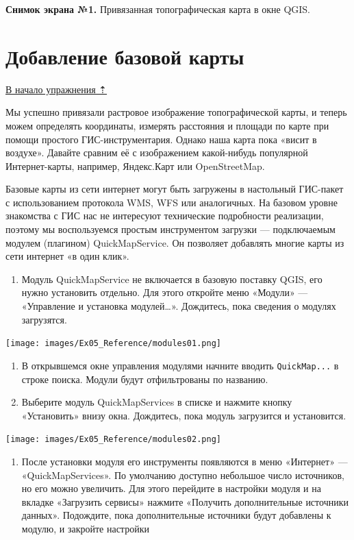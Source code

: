 \documentclass[
  12pt,
]{book}
\providecommand{\tightlist}{%
  \setlength{\itemsep}{0pt}\setlength{\parskip}{0pt}}
\begin{document}
\textbf{Снимок экрана №1.} Привязанная топографическая карта в окне QGIS.

\hypertarget{raster-reference-basemap}{%
\section{Добавление базовой карты}\label{raster-reference-basemap}}

\protect\hyperlink{raster-reference}{В начало упражнения ⇡}

Мы успешно привязали растровое изображение топографической карты, и теперь можем определять координаты, измерять расстояния и площади по карте при помощи простого ГИС-инструментария. Однако наша карта пока «висит в воздухе». Давайте сравним её с изображением какой-нибудь популярной Интернет-карты, например, Яндекс.Карт или OpenStreetMap.

Базовые карты из сети интернет могут быть загружены в настольный ГИС-пакет с использованием протокола WMS, WFS или аналогичных. На базовом уровне знакомства с ГИС нас не интересуют технические подробности реализации, поэтому мы воспользуемся простым инструментом загрузки --- подключаемым модулем (плагином) QuickMapService. Он позволяет добавлять многие карты из сети интернет «в один клик».

\begin{enumerate}
\def\labelenumi{\arabic{enumi}.}
\tightlist
\item
  Модуль QuickMapService не включается в базовую поставку QGIS, его нужно установить отдельно. Для этого откройте меню «Модули» --- «Управление и установка модулей\ldots». Дождитесь, пока сведения о модулях загрузятся.
\end{enumerate}

\texttt{[image: images/Ex05\_Reference/modules01.png]}

\begin{enumerate}
\def\labelenumi{\arabic{enumi}.}
\setcounter{enumi}{1}
\item
  В открывшемся окне управления модулями начните вводить \texttt{QuickMap...} в строке поиска. Модули будут отфильтрованы по названию.
\item
  Выберите модуль QuickMapServices в списке и нажмите кнопку «Установить» внизу окна. Дождитесь, пока модуль загрузится и установится.
\end{enumerate}

\texttt{[image: images/Ex05\_Reference/modules02.png]}

\begin{enumerate}
\def\labelenumi{\arabic{enumi}.}
\setcounter{enumi}{3}
\tightlist
\item
  После установки модуля его инструменты появляются в меню «Интернет» --- «QuickMapServices». По умолчанию доступно небольшое число источников, но его можно увеличить. Для этого перейдите в настройки модуля и на вкладке «Загрузить сервисы» нажмите «Получить дополнительные источники данных». Подождите, пока дополнительные источники будут добавлены к модулю, и закройте настройки
\end{enumerate}
\end{document}
